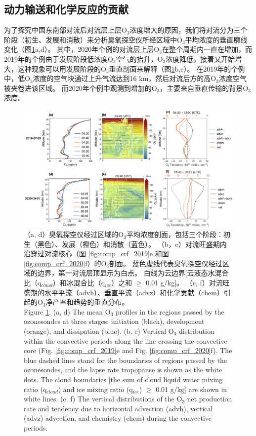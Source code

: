 \subsection{动力输送和化学反应的贡献} \label{sec:convec_impacts}

为了探究中国东南部对流后对流层上层O$_3$浓度增大的原因，我们将对流分为三个阶段（初生、发展和消散）来分析臭氧探空仪所经区域中O$_3$平均浓度的垂直廓线变化（图\ref{fig:tendency_o3}a,d）。
其中，2020年个例的对流层上层O$_3$在整个周期内一直在增加，而2019年的个例由于发展阶段低浓度O$_3$空气的抬升，O$_3$浓度降低，接着又开始增大，这种现象可以用发展阶段的O$_3$垂直剖面来解释（图\ref{fig:tendency_o3}b,e）。
在2019年的个例中，低O$_3$浓度的空气块通过上升气流达到16 km，然后对流后方的高O$_3$浓度空气被夹卷进该区域。
而2020年个例中观测到增加的O$_3$，主要来自垂直传输的背景O$_3$浓度。

\begin{figure}[H]
\centering
\includegraphics[width=\textwidth]{./figures/tendency_o3.png}
\caption{
（a, d）臭氧探空仪经过区域的O$_3$平均浓度剖面，包括三个阶段：初生（黑色）、发展（橙色）和消散（蓝色）。
（b，e）对流旺盛期内沿穿过对流核心（图 \ref{fig:comp_crf_2019}e 和图 \ref{fig:comp_crf_2020}f）的O$_3$剖面。
蓝色虚线代表臭氧探空仪经过区域的边界，第一对流层顶显示为白点。
白线为云边界[云液态水混合比（q$_{cloud}$）和冰混合比（q$_{ice}$）之和 $\geq$ 0.01 g/kg]。
（c, f）对流旺盛期的水平平流（advh）、垂直平流（advz）和化学贡献（chem）引起的O$_3$净产率和趋势的垂直分布。
\\
Figure \ref{fig:tendency_o3}. (a, d) The mean O$_3$ profiles in the regions passed by the ozonesondes
at three stages: initiation (black), development (orange), and dissipation (blue).
(b, e) Vertical O$_3$ distribution within the convective periods along the line crossing the convective core (Fig. \ref{fig:comp_crf_2019}e and Fig. \ref{fig:comp_crf_2020}f).
The blue dashed lines stand for the boundaries of regions passed by the ozonesondes, and the lapse rate tropopause is shown as the white dots.
The cloud boundaries [the sum of cloud liquid water mixing ratio (q$_{cloud}$) and ice mixing ratio (q$_{ice}$) $\geq$ 0.01 g/kg] are shown in white lines.
(c, f) The vertical distributions of the O$_3$ net production rate and tendency due to horizontal advection (advh), vertical (advz) advection, and chemistry (chem) during the convective periods.
}
\label{fig:tendency_o3}
\end{figure}

